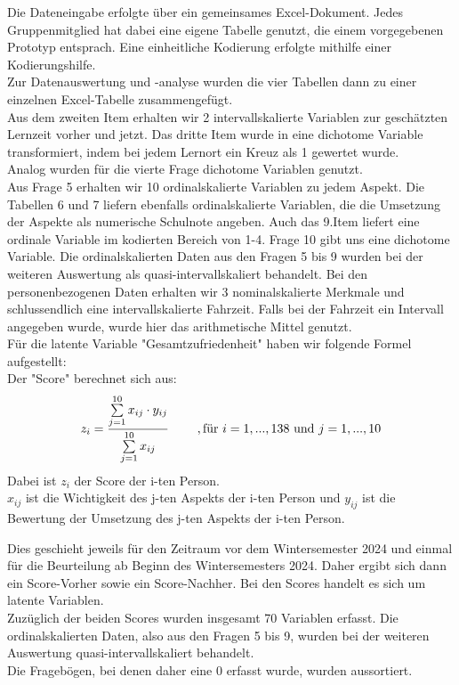 \documentclass[11pt, a4paper]{article}
\begin{document}
Die Dateneingabe erfolgte über ein gemeinsames Excel-Dokument. Jedes Gruppenmitglied hat dabei eine eigene Tabelle genutzt, die einem vorgegebenen Prototyp entsprach. Eine einheitliche Kodierung erfolgte mithilfe einer Kodierungshilfe. \\
Zur Datenauswertung und -analyse wurden die vier Tabellen dann zu einer einzelnen Excel-Tabelle zusammengefügt. \\

Aus dem zweiten Item erhalten wir 2 intervallskalierte Variablen zur geschätzten Lernzeit vorher und jetzt. 
Das dritte Item wurde in eine dichotome Variable transformiert, indem bei jedem Lernort ein Kreuz als 1 gewertet wurde.\\
Analog wurden für die vierte Frage dichotome Variablen genutzt.\\
Aus Frage 5 erhalten wir 10 ordinalskalierte Variablen zu jedem Aspekt.
Die Tabellen 6 und 7 liefern ebenfalls ordinalskalierte Variablen, die die Umsetzung der Aspekte als numerische Schulnote angeben.
Auch das 9.Item liefert eine ordinale Variable im kodierten Bereich von 1-4.
Frage 10 gibt uns eine dichotome Variable.
Die ordinalskalierten Daten aus den Fragen 5 bis 9 wurden bei der weiteren Auswertung als quasi-intervallskaliert behandelt.
Bei den personenbezogenen Daten erhalten wir 3 nominalskalierte Merkmale und schlussendlich eine intervallskalierte Fahrzeit.
Falls bei der Fahrzeit ein Intervall angegeben wurde, wurde hier das arithmetische Mittel genutzt. \\


Für die latente Variable "Gesamtzufriedenheit" haben wir folgende Formel aufgestellt:  \\
Der "Score" berechnet sich aus:
\begin{equation*}
	z_i = \frac{\sum\limits_{j=1}^{10}x_{ij}\cdot  y_{ij}}{\sum\limits_{j=1}^{10}x_{ij}} \hspace{0.8cm} , \text{für} \ 
	i=1,...,138\  \text{und} \ j=1,...,10
\end{equation*} 
Dabei ist $z_i$ der Score der i-ten Person. \\
$x_{ij}$ ist die Wichtigkeit des j-ten Aspekts der i-ten Person und
$y_{ij}$ ist die Bewertung der Umsetzung des j-ten Aspekts der i-ten Person.


Dies geschieht jeweils für den Zeitraum vor dem Wintersemester 2024 und einmal für die Beurteilung ab Beginn des Wintersemesters 2024. Daher ergibt sich dann ein Score-Vorher sowie ein Score-Nachher. Bei den Scores handelt es sich um latente Variablen.
\\
Zuzüglich der beiden Scores wurden insgesamt 70 Variablen erfasst.
Die ordinalskalierten Daten, also aus den Fragen 5 bis 9, wurden bei der weiteren Auswertung quasi-intervallskaliert behandelt.
\\
Die Fragebögen, bei denen daher eine 0 erfasst wurde, wurden aussortiert.
\end{document}
